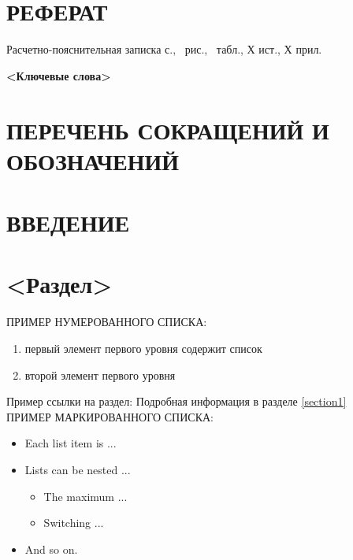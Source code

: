 \documentclass[14pt]{templateReportBMSTU}
\begin{document}
	\normalsize
	\setcounter{page}{4}

	\pagebreak

	\section*{РЕФЕРАТ}
		\begin{center}
			Расчетно-пояснительная записка \pageref{LastPage} с., \totalfigures\ рис., \totaltables\ табл., Х ист., Х прил.

			\textbf{<Ключевые слова>}
		\end{center}

		\pagebreak

	\renewcommand{\contentsname}{\normalsize\bfseries\centering СОДЕРЖАНИЕ}
	\small
	\tableofcontents
	\normalsize

		\pagebreak

	\section*{ПЕРЕЧЕНЬ СОКРАЩЕНИЙ И ОБОЗНАЧЕНИЙ}

		\pagebreak

	\section*{ВВЕДЕНИЕ}

		\pagebreak

	\section{<Раздел>}

	ПРИМЕР НУМЕРОВАННОГО СПИСКА:
	\begin{enumerate} 
  		\item первый элемент первого уровня содержит список 
		\item  второй элемент первого уровня
	\end{enumerate}
	Пример ссылки на раздел: Подробная информация в разделе \ref{section1}
	\\ ПРИМЕР МАРКИРОВАННОГО СПИСКА:
	\begin{itemize}
		\item Each list item is ...
		\item Lists can be nested ...
			\begin{itemize}
				\item The maximum ...
				\item Switching ...
			\end{itemize}
		\item And so on.
	\end{itemize}
	
\end{document}
